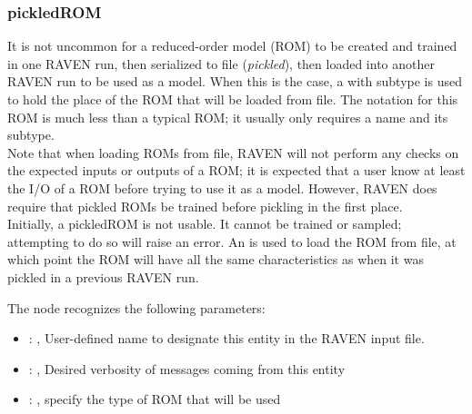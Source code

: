 \subsubsection{pickledROM}
  It is not uncommon for a reduced-order model (ROM) to be created and trained in one RAVEN run,
  then     serialized to file (\emph{pickled}), then loaded into another RAVEN run to be used as a
  model.  When this is     the case, a  with subtype  is used to
  hold the place of the ROM that will     be loaded from file.  The notation for this ROM is much
  less than a typical ROM; it usually only requires a name and     its subtype.     \\     Note that
  when loading ROMs from file, RAVEN will not perform any checks on the expected inputs or outputs
  of     a ROM; it is expected that a user know at least the I/O of a ROM before trying to use it as
  a model.     However, RAVEN does require that pickled ROMs be trained before pickling in the first
  place.     \\     Initially, a pickledROM is not usable.  It cannot be trained or sampled;
  attempting to do so will raise an     error.  An  is used to load the ROM from
  file, at which point the ROM will have all the same     characteristics as when it was pickled in
  a previous RAVEN run.

  The  node recognizes the following parameters:
    \begin{itemize}
      \item {}: ,
        User-defined name to designate this entity in the RAVEN input file.
      \item {}: ,
        Desired verbosity of messages coming from this entity
      \item {}: ,
        specify the type of ROM that will be used
  \end{itemize}

